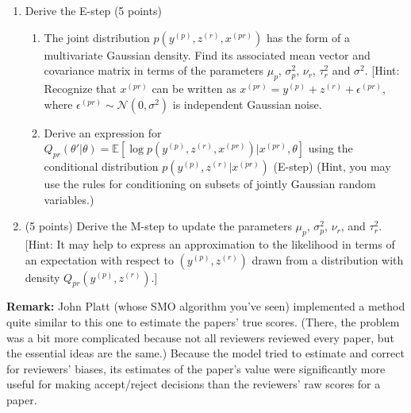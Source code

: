 \documentclass[12pt]{article}
\begin{document}
\begin{enumerate}
\item Derive the E-step (5 points)

\begin{enumerate}
\item  The joint distribution $p(y^{(p)},z^{(r)},x^{(pr)})$ has the form of a multivariate Gaussian density. Find its associated mean vector and covariance matrix in terms of the parameters $\mu_p$, $\sigma_p^2$, $\nu_r$, $\tau_r^2$ and $\sigma^2$.
[Hint: Recognize that $x^{(pr)}$ can be written as $x^{(pr)} = y^{(p)} + z^{(r)} + \epsilon^{(pr)}$, where $\epsilon^{(pr)} \sim \mathcal{N}(0, \sigma^2)$ is independent Gaussian noise.

\item Derive an expression for $Q_{pr}(\theta'|\theta)  = \mathbb{E}[\log p(y^{(p)}, z^{(r)}, x^{(pr)})|x^{(pr)},\theta]$ using the conditional distribution $p(y^{(p)},z^{(r)}|x^{(pr)})$ (E-step) (Hint, you may use the rules for conditioning on subsets of jointly Gaussian random variables.) %
\end{enumerate}

\item (5 points) Derive the M-step to update the parameters $\mu_p$, $\sigma_p^2$, $\nu_r$, and $\tau_r^2$. [Hint: It may help to express an approximation to the likelihood in terms of an expectation with respect to $(y^{(p)}, z^{(r)})$ drawn from a distribution with density $Q_{pr}(y^{(p)}, z^{(r)})$.]

\end{enumerate}

{\bf Remark:} John Platt (whose SMO algorithm you've seen) implemented a method quite similar to this one to estimate the papers' true scores. (There, the problem was a bit more complicated because not all reviewers reviewed every paper, but the essential ideas are the same.) Because the model tried to estimate and correct for reviewers' biases, its estimates of the paper's value were significantly more useful for making accept/reject decisions than the reviewers' raw scores for a paper.
\end{document}
